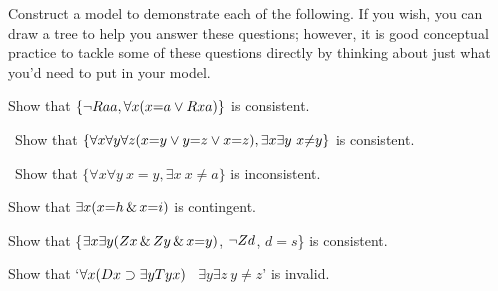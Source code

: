 \solutions
\problempart Construct a model to demonstrate each of the following. If you wish, you can draw a tree to help you answer these questions; however, it is good conceptual practice to tackle some of these questions directly by thinking about just what you'd need to put in your model.
\label{pr.IdentityModels}
\begin{earg}
\item Show that $\{{\neg}Raa, \forall x (x{=}a \vee Rxa)\}$
is consistent.
\item\ Show that $\{\forall x\forall y\forall z(x{=}y \vee y{=}z \vee x{=}z),
\exists x\exists y\ x{\neq} y\}$ is consistent.
\item\ Show that $\{\forall x\forall y\ x{=}y, \exists x\ x {\neq} a\}$ is inconsistent.
\item Show that $\exists x (x {=} h \,\&\, x {=} i)$ is contingent.
\item Show that \{$\exists x\exists y(Zx \,\&\, Zy \,\&\, x{=}y)$, $\neg Zd$, $d{=}s$\} is consistent.
\item Show that `$\forall x(Dx \supset \exists y Tyx)$ \therefore\ $\exists y \exists z\ y{\neq} z$' is invalid.
\end{earg}

